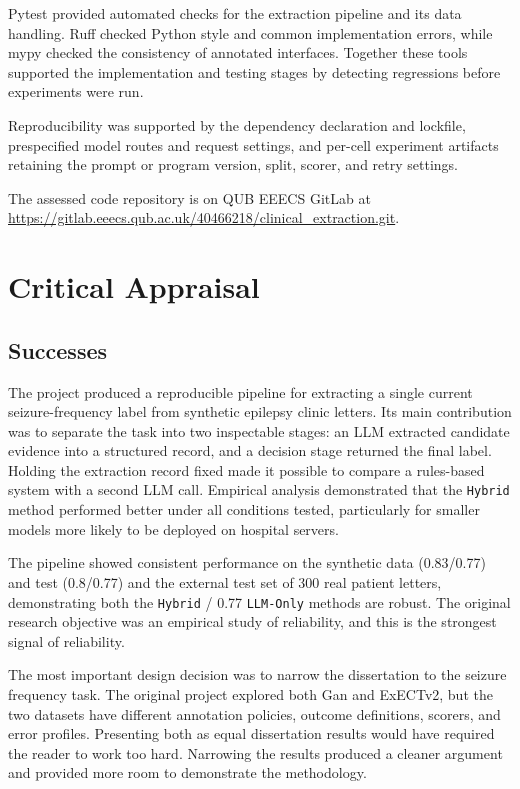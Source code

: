 \documentclass[conference]{IEEEtran}
\begin{document}
Pytest provided automated checks for the extraction pipeline and its data
handling. Ruff checked Python style and common implementation errors, while
mypy checked the consistency of annotated interfaces. Together these tools
supported the implementation and testing stages by detecting regressions
before experiments were run. 

Reproducibility was supported by the dependency declaration and lockfile,
prespecified model routes and request settings, and per-cell experiment
artifacts retaining the prompt or program version, split, scorer, and retry
settings. 

The assessed code repository is on QUB EEECS
GitLab at \url{https://gitlab.eeecs.qub.ac.uk/40466218/clinical_extraction.git}.

\section{Critical Appraisal}

\subsection{Successes}

The project produced a reproducible pipeline for extracting a
single current seizure-frequency label from synthetic epilepsy clinic letters.
Its main contribution was to separate the task into two inspectable stages:
an LLM extracted candidate evidence into a structured record, and a decision
stage returned the final label. Holding the extraction record fixed made it
possible to compare a rules-based system with a second LLM call. Empirical
analysis demonstrated that the \texttt{Hybrid} method performed better under 
all conditions tested, particularly for smaller models more likely to be deployed
on hospital servers.

The pipeline showed consistent performance on the synthetic data (0.83/0.77)
and test (0.8/0.77) and the external test set of 300 real patient letters, demonstrating 
both the \texttt{Hybrid} / 0.77 \texttt{LLM-Only} methods are robust. The original
research objective was an empirical study of reliability, and this is the strongest
signal of reliability.

The most important design decision was to narrow the dissertation to the
seizure frequency task. The original project explored both Gan and ExECTv2,
but the two datasets have different annotation policies, outcome definitions,
scorers, and error profiles. Presenting both as equal dissertation results
would have required the reader to work too hard. Narrowing the results 
produced a cleaner argument and provided more room to demonstrate the
methodology. 
\end{document}
